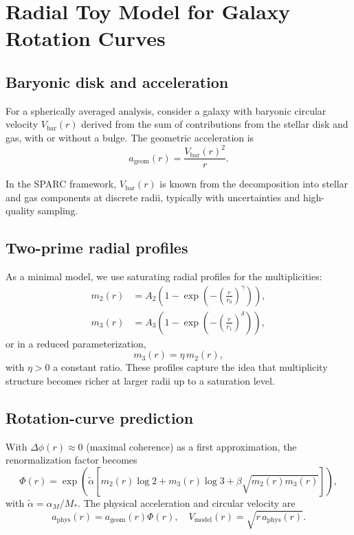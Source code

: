 \documentclass[11pt]{article}
\begin{document}
\section{Radial Toy Model for Galaxy Rotation Curves}

\subsection{Baryonic disk and acceleration}

For a spherically averaged analysis, consider a galaxy with baryonic circular velocity \(V_{\mathrm{bar}}(r)\) derived from the sum of contributions from the stellar disk and gas, with or without a bulge. The geometric acceleration is
\[
a_{\mathrm{geom}}(r) = \frac{V_{\mathrm{bar}}(r)^2}{r}.
\]

In the SPARC framework, \(V_{\mathrm{bar}}(r)\) is known from the decomposition into stellar and gas components at discrete radii, typically with uncertainties and high-quality sampling.

\subsection{Two-prime radial profiles}

As a minimal model, we use saturating radial profiles for the multiplicities:
\begin{align}
m_2(r) &= A_2\left(1 - \exp\left(-\left(\frac{r}{r_0}\right)^\gamma\right)\right),\\
m_3(r) &= A_3\left(1 - \exp\left(-\left(\frac{r}{r_1}\right)^\delta\right)\right),
\end{align}
or in a reduced parameterization,
\[
m_3(r) = \eta\, m_2(r),
\]
with \(\eta>0\) a constant ratio. These profiles capture the idea that multiplicity structure becomes richer at larger radii up to a saturation level.

\subsection{Rotation-curve prediction}

With \(\Delta\phi(r)\approx 0\) (maximal coherence) as a first approximation, the renormalization factor becomes
\[
\Phi(r) = \exp\!\left(\tilde\alpha\left[m_2(r)\log 2 + m_3(r)\log 3 + \beta\sqrt{m_2(r)m_3(r)}\right]\right),
\]
with \(\tilde\alpha = \alpha_M/M_*\). The physical acceleration and circular velocity are
\[
a_{\mathrm{phys}}(r) = a_{\mathrm{geom}}(r)\Phi(r),\quad
V_{\mathrm{model}}(r) = \sqrt{r\,a_{\mathrm{phys}}(r)}.
\]
\end{document}
